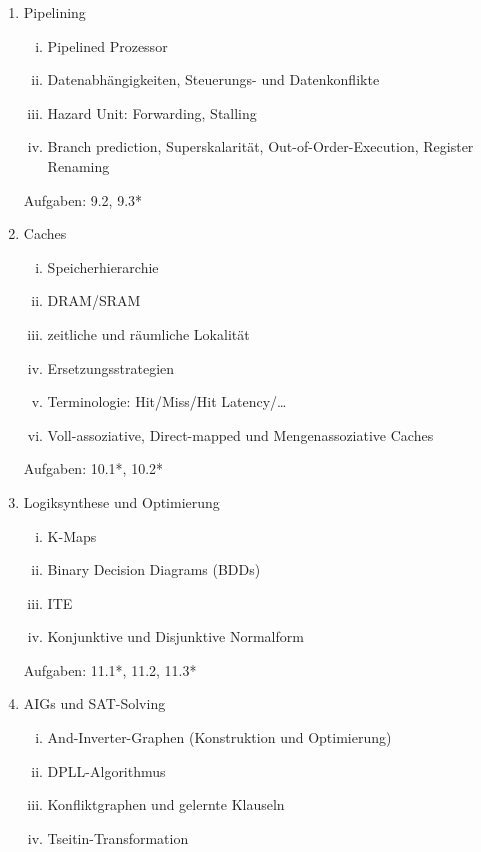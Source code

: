 \documentclass{article}
\begin{document}
\begin{enumerate}
\begin{enumerate}[i.]
		      \item Multi-Cycle-Prozessor, insbesondere Signalbelegungen
	      \end{enumerate}
	      Aufgaben: 8.1, 8.2, 8.3
	\item Pipelining
	      \begin{enumerate}[i.]
		      \item Pipelined Prozessor
		      \item Datenabhängigkeiten, Steuerungs- und Datenkonflikte
		      \item Hazard Unit: Forwarding, Stalling
		      \item Branch prediction, Superskalarität, Out-of-Order-Execution, Register Renaming
	      \end{enumerate}
	      Aufgaben: 9.2, 9.3*
	\item Caches
	      \begin{enumerate}[i.]
		      \item Speicherhierarchie
		      \item DRAM/SRAM
		      \item zeitliche und räumliche Lokalität
		      \item Ersetzungsstrategien
		      \item Terminologie: Hit/Miss/Hit Latency/\ldots
		      \item Voll-assoziative, Direct-mapped und Mengenassoziative Caches
	      \end{enumerate}
	      Aufgaben: 10.1*, 10.2*
	\item Logiksynthese und Optimierung
	      \begin{enumerate}[i.]
		      \item K-Maps
		      \item Binary Decision Diagrams (BDDs)
		      \item ITE
		      \item Konjunktive und Disjunktive Normalform
	      \end{enumerate}
	      Aufgaben: 11.1*, 11.2, 11.3*
	\item AIGs und SAT-Solving
	      \begin{enumerate}[i.]
		      \item And-Inverter-Graphen (Konstruktion und Optimierung)
		      \item DPLL-Algorithmus
		      \item Konfliktgraphen und gelernte Klauseln
		      \item Tseitin-Transformation
	      \end{enumerate}

\end{enumerate}
\end{document}
